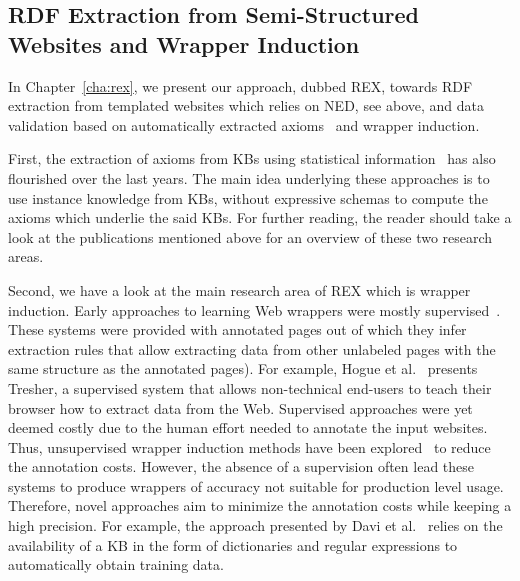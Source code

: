 
\subsection{RDF Extraction from Semi-Structured Websites and Wrapper Induction}

In Chapter~\ref{cha:rex}, we present our approach, dubbed REX, towards \ac{RDF} extraction from templated websites which relies on \ac{NED}, see above, and data validation based on automatically extracted axioms~\cite{buhmann2012} and wrapper induction. 

\bigskip


First, the extraction of axioms from \ac{KB}s using statistical information~\cite{buhmann2012,pattern_enrichment} has also flourished over the last years. 
The main idea underlying these approaches is to use instance knowledge from  \ac{KB}s, without expressive schemas to compute the axioms which underlie the said  \ac{KB}s. 
For further reading, the reader should take a look at the publications mentioned above for an overview of these two research areas.

Second, we have a look at the main research area of REX which is wrapper induction. 
Early approaches to learning Web wrappers were mostly supervised~\cite{flesca2004web,Hogue:2005:TAU:1060745.1060762}. 
These systems were provided with annotated pages out of which they infer extraction rules that allow extracting data from other unlabeled pages with the same structure as the annotated pages). 
For example, Hogue et al.~\cite{Hogue:2005:TAU:1060745.1060762} presents {Tresher}, a supervised system that allows non-technical end-users to teach their browser how to extract data from the Web. 
Supervised approaches were yet deemed costly due to the human effort needed to annotate the input websites. 
Thus, unsupervised wrapper induction methods have been explored~\cite{exalg,DBLP:journals/aai/CrescenziM08} to reduce the annotation costs. 
However, the absence of a supervision often lead these systems to produce wrappers of accuracy not suitable for production level usage.
Therefore, novel approaches aim to minimize the annotation costs while keeping a high precision.
For example, the approach presented by Davi et al.~\cite{Dalvi:2011:AWL:1938545.1938547} relies on the availability of a  \ac{KB} in the form of dictionaries and regular expressions to automatically obtain training data. 


